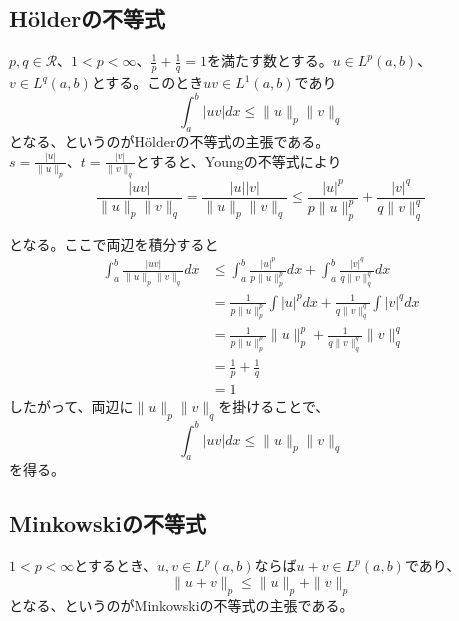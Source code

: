 \documentclass[a4paper,10pt]{jsarticle}
\begin{document}
\subsection{H\"{o}lderの不等式}
$p, q\in\mathcal{R}$、$1 < p < \infty$、$\frac{1}{p} + \frac{1}{q}=1$を満たす数とする。$u \in L^p(a, b)$、$v \in L^q(a, b)$とする。このとき$uv\in L^1(a,b)$であり
\begin{equation}
 \int_a^b |uv|dx \le \|u\|_p \|v\|_q
\end{equation}
となる、というのがH\"{o}lderの不等式の主張である。\\
$s = \frac{|u|}{\|u\|_p}$、$t = \frac{|v|}{\|v\|_q}$とすると、Youngの不等式により
\begin{equation}
 \frac{|uv|}{\|u\|_p \|v\|_q} = \frac{|u||v|}{\|u\|_p \|v\|_q} \le \frac{|u|^p}{p\|u\|_p^p} + \frac{|v|^q}{q\|v\|_q^q}
\end{equation}

となる。ここで両辺を積分すると
\begin{align}
 \int_a^b \frac{|uv|}{\|u\|_p\|v\|_q}dx &\le \int_a^b \frac{|u|^p}{p\|u\|_p^p} dx + \int_a^b \frac{|v|^q}{q\|v\|_q^q} dx \\
  & = \frac{1}{p\|u\|_p^p}\int |u|^p dx + \frac{1}{q\|v\|_q^q}\int |v|^q dx \\
  & = \frac{1}{p\|u\|_p^p}\|u\|_p^p + \frac{1}{q\|v\|_q^q}\|v\|_q^q \\
  & = \frac{1}{p} + \frac{1}{q} \\
  & = 1
\end{align}
したがって、両辺に$\|u\|_p\|v\|_q$を掛けることで、
\begin{equation}
 \int_a^b |uv|dx \le \|u\|_p\|v\|_q
\end{equation}
を得る。
\subsection{Minkowskiの不等式}
$1<p<\infty$とするとき、$u,v\in L^p(a, b)$ならば$u+v\in L^p(a, b)$であり、
\begin{equation}
 \|u+v\|_p\le\|u\|_p + \|v\|_p
\end{equation}
となる、というのがMinkowskiの不等式の主張である。\\
\end{document}
